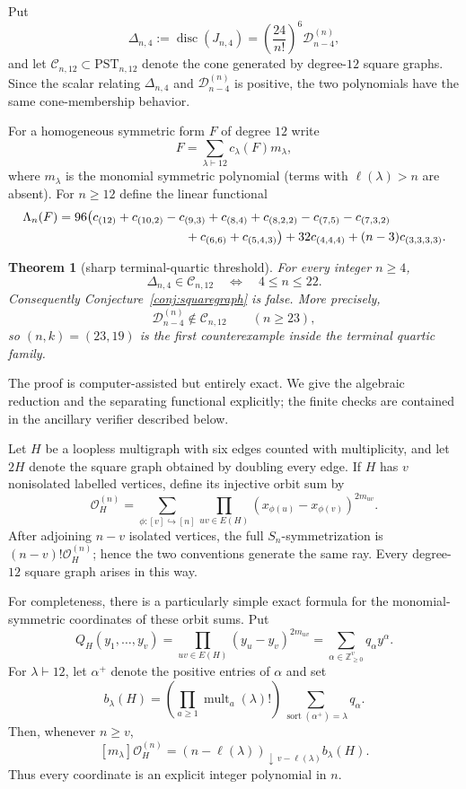 \documentclass[11pt]{amsart}
\numberwithin{equation}{section}
\newtheorem{theorem}{Theorem}
\newcommand{\D}{\mathcal D}
\newcommand{\disc}{\operatorname{disc}}
\begin{document}
Put
\[
   \Delta_{n,4}:=\disc(J_{n,4})
   =\left(\frac{24}{n!}\right)^6\D_{n-4}^{(n)},
\]
and let $\mathcal C_{n,12}\subset\mathrm{PST}_{n,12}$ denote the cone
generated by degree-$12$ square graphs.  Since the scalar relating
$\Delta_{n,4}$ and $\D_{n-4}^{(n)}$ is positive, the two polynomials have the
same cone-membership behavior.

For a homogeneous symmetric form $F$ of degree $12$ write
\[
       F=\sum_{\lambda\vdash12}c_\lambda(F)m_\lambda,
\]
where $m_\lambda$ is the monomial symmetric polynomial (terms with
$\ell(\lambda)>n$ are absent).  For $n\ge12$ define the linear functional
\begin{align}\label{eq:quartic-separator}
\Lambda_n(F)={}&96\bigl(
 c_{(12)}+c_{(10,2)}-c_{(9,3)}+c_{(8,4)}+c_{(8,2,2)}
 -c_{(7,5)}-c_{(7,3,2)} \notag\\
&\hspace{31mm}+c_{(6,6)}+c_{(5,4,3)}\bigr)
 +32c_{(4,4,4)}+(n-3)c_{(3,3,3,3)}.
\end{align}

\begin{theorem}[sharp terminal-quartic threshold]\label{thm:quartic-threshold}
For every integer $n\ge4$,
\[
             \Delta_{n,4}\in\mathcal C_{n,12}
             \quad\Longleftrightarrow\quad 4\le n\le22.
\]
Consequently Conjecture~\ref{conj:squaregraph} is false.  More precisely,
\[
       \D_{n-4}^{(n)}\notin\mathcal C_{n,12}
       \qquad(n\ge23),
\]
so $(n,k)=(23,19)$ is the first counterexample inside the terminal quartic
family.
\end{theorem}

The proof is computer-assisted but entirely exact.  We give the algebraic
reduction and the separating functional explicitly; the finite checks are
contained in the ancillary verifier described below.

Let $H$ be a loopless multigraph with six edges counted with multiplicity,
and let $2H$ denote the square graph obtained by doubling every edge.  If
$H$ has $v$ nonisolated labelled vertices, define its injective orbit sum by
\[
 \mathcal O_H^{(n)}=
 \sum_{\phi:[v]\hookrightarrow[n]}
 \prod_{uv\in E(H)}(x_{\phi(u)}-x_{\phi(v)})^{2m_{uv}}.
\]
After adjoining $n-v$ isolated vertices, the full $S_n$-symmetrization is
$(n-v)!\mathcal O_H^{(n)}$; hence the two conventions generate the same ray.
Every degree-$12$ square graph arises in this way.

For completeness, there is a particularly simple exact formula for the
monomial-symmetric coordinates of these orbit sums.  Put
\[
 Q_H(y_1,\ldots,y_v)=
 \prod_{uv\in E(H)}(y_u-y_v)^{2m_{uv}}
 =\sum_{\alpha\in\mathbb Z_{\ge0}^v}q_\alpha y^\alpha.
\]
For $\lambda\vdash12$, let $\alpha^+$ denote the positive entries of $\alpha$
and set
\[
 b_\lambda(H)=
 \left(\prod_{a\ge1}\operatorname{mult}_a(\lambda)!\right)
 \sum_{\operatorname{sort}(\alpha^+)=\lambda}q_\alpha .
\]
Then, whenever $n\ge v$,
\begin{equation}\label{eq:orbit-monomial-coordinate}
 [m_\lambda]\mathcal O_H^{(n)}
 =(n-\ell(\lambda))_{\downarrow\,v-\ell(\lambda)}b_\lambda(H).
\end{equation}
Thus every coordinate is an explicit integer polynomial in $n$.
\end{document}
